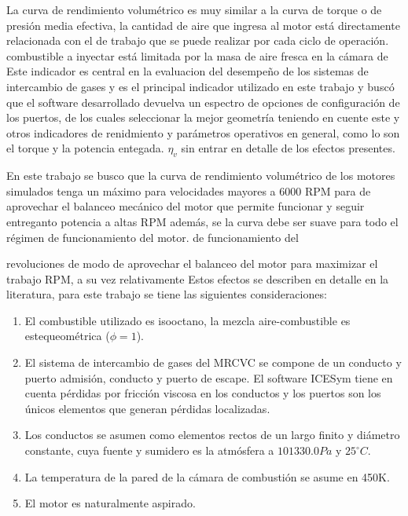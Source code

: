 La curva de rendimiento volumétrico es muy similar a la curva de torque o de
presión media efectiva, la cantidad de aire que ingresa al motor está
directamente relacionada con el de trabajo que se puede realizar por cada ciclo
de operación.
%
combustible a inyectar está limitada por la masa de aire fresca en la cámara de
%
Este indicador es central en la evaluacion del desempeño de los sistemas de
intercambio de gases y es el principal indicador utilizado en este trabajo y
buscó que el software desarrollado devuelva un espectro de opciones de
configuración de los puertos, de los cuales seleccionar la mejor geometría
teniendo en cuente este y otros indicadores de renidmiento y parámetros
operativos en general, como lo son el torque y la potencia entegada.
%
$\eta_v$ sin entrar en detalle de los efectos presentes.

En este trabajo se busco que la curva de rendimiento volumétrico de los motores
simulados tenga un máximo para velocidades mayores a 6000 RPM para de aprovechar
el balanceo mecánico del motor que permite funcionar y seguir entreganto
potencia a altas RPM además, se la curva debe ser suave para todo el régimen de
funcionamiento del motor.
%
de funcionamiento del %

revoluciones de modo de aprovechar el balanceo del motor para maximizar el
trabajo %
RPM, a su vez %
relativamente %
%
Estos efectos se describen en detalle en la literatura\parencite{heywood}, para
este trabajo se tiene las siguientes consideraciones:

\begin{enumerate}
    \item El combustible utilizado es isooctano, la mezcla aire-combustible es
estequeométrica ($\phi=1$).
    \item El sistema de intercambio de gases del MRCVC se compone de un conducto
y puerto admisión, conducto y puerto de escape.
        El software ICESym tiene en cuenta pérdidas por fricción viscosa en los
conductos y los puertos son los únicos elementos que generan pérdidas
localizadas.
    \item Los conductos se asumen como elementos rectos de un largo finito y
diámetro constante, cuya fuente y sumidero es la atmósfera a $101330.0 Pa$ y
$25^{\circ}C$.
    \item La temperatura de la pared de la cámara de combustión se asume en
450K.
    \item El motor es naturalmente aspirado.
\end{enumerate}

